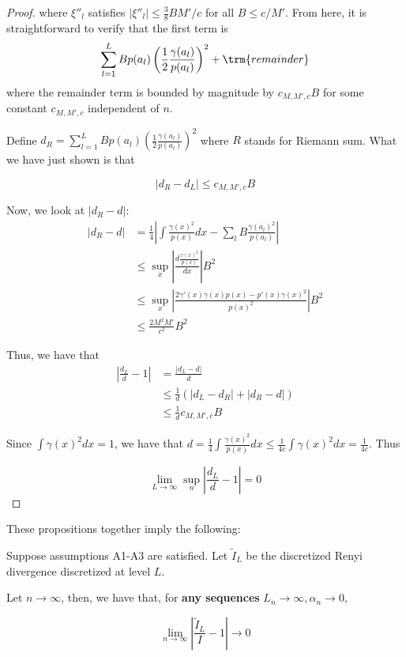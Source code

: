 \documentclass{article}
\begin{document}
\begin{proof}
where $\xi''_l$ satisfies $| \xi''_l | \leq \frac{3}{8} B M'/c$ for all $B \leq c / M'$. From here, it is straightforward to verify that the first term is 
\[
\sum_{l=1}^L Bp(a_l) \left( \frac{1}{2} \frac{\gamma(a_l)}{p(a_l)} \right)^2 + \trm{remainder}
\]
where the remainder term is bounded by magnitude by $c_{M, M', c}B$ for some constant $c_{M, M', c}$ independent of $n$. 

Define $d_R = \sum_{l=1}^L B p(a_l) \left( \frac{1}{2} \frac{\gamma(a_l)}{p(a_l)} \right)^2 $ where $R$ stands for Riemann sum. What we have just shown is that

\[
| d_R - d_L | \leq c_{M, M', c} B 
\]

Now, we look at $| d_R - d |$:
\begin{align*}
|d_R - d| &= \frac{1}{4} \left| \int \frac{\gamma(x)^2}{p(x)} dx - \sum_l B \frac{\gamma(a_l)^2}{p(a_l)} \right| \\
 &\leq \sup_x \left| \frac{ d \frac{\gamma(x)^2}{p(x)} }{dx} \right| B^2 \\
 &\leq \sup_x \left| \frac{ 2 \gamma'(x) \gamma(x) p(x) - p'(x) \gamma(x)^2 }{p(x)^2} \right| B^2 \\
 &\leq \frac{2 M^2 M' }{c^2} B^2 
\end{align*}

Thus, we have that
\begin{align*}
\left|\frac{d_L}{d} - 1 \right| &= \frac{| d_L - d |}{d} \\
  &\leq \frac{1}{d} \left( |d_L - d_R| + |d_R - d| \right) \\
  &\leq \frac{1}{d} c_{M, M', c} B 
\end{align*}

Since $\int \gamma(x)^2 dx = 1$, we have that $d = \frac{1}{4} \int \frac{\gamma(x)^2}{p(x)} dx \leq \frac{1}{4c} \int \gamma(x)^2 dx = \frac{1}{4c}$. Thus

\[
\lim_{L \rightarrow \infty} \sup_n  \left| \frac{d_L}{d} - 1 \right| = 0
\]
 
\end{proof}


These propositions together imply the following:
\begin{shaded}
\begin{theorem}
\label{thm:relative_convergence_discrete_continuous_renyi}
Suppose assumptions A1-A3 are satisfied. Let $\tilde{I}_L$ be the discretized Renyi divergence discretized at level $L$.

Let $n \rightarrow \infty$, then, we have that, for \textbf{any sequences} $L_n \rightarrow \infty, \alpha_n \rightarrow 0$,

\[
\lim_{n \rightarrow \infty} \left| \frac{\tilde{I}_L}{I} - 1 \right| \rightarrow 0
\]

\end{theorem}
\end{shaded}
\end{document}

